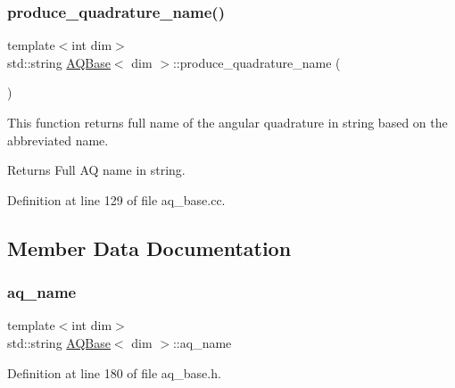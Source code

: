 \mbox{\label{class_a_q_base_a4ae1370033705c82d08686fd651ad6e8}} 
\subsubsection{\texorpdfstring{produce\+\_\+quadrature\+\_\+name()}{produce\_quadrature\_name()}}
{\footnotesize\ttfamily template$<$int dim$>$ \\
std\+::string \hyperlink{class_a_q_base}{A\+Q\+Base}$<$ dim $>$\+::produce\+\_\+quadrature\+\_\+name (\begin{DoxyParamCaption}{ }\end{DoxyParamCaption})\hspace{0.3cm}{\ttfamily [private]}}

This function returns full name of the angular quadrature in string based on the abbreviated name.

\begin{DoxyReturn}{Returns}
Full AQ name in string. 
\end{DoxyReturn}


Definition at line 129 of file aq\+\_\+base.\+cc.



\subsection{Member Data Documentation}
\mbox{\label{class_a_q_base_a3e50d2d59d1a4a2fabed3c4852f80c49}} 
\subsubsection{\texorpdfstring{aq\+\_\+name}{aq\_name}}
{\footnotesize\ttfamily template$<$int dim$>$ \\
std\+::string \hyperlink{class_a_q_base}{A\+Q\+Base}$<$ dim $>$\+::aq\+\_\+name\hspace{0.3cm}{\ttfamily [private]}}



Definition at line 180 of file aq\+\_\+base.\+h.

\mbox{\label{class_a_q_base_a0d9e9c6302e481718d62d76c09c83d2d}} 
